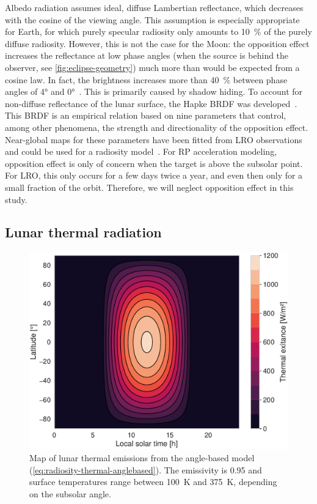 Albedo radiation assumes ideal, diffuse Lambertian reflectance, which decreases with the cosine of the viewing angle. This assumption is especially appropriate for Earth, for which purely specular radiosity only amounts to \qty{10}{\percent} of the purely diffuse radiosity. However, this is not the case for the Moon: the opposition effect increases the reflectance at low phase angles (when the source is behind the observer, see \cref{fig:eclipse-geometry}) much more than would be expected from a cosine law. In fact, the brightness increases more than \qty{40}{\percent} between phase angles of \ang{4} and \ang{0}~\cite{Buratti1996}. This is primarily caused by shadow hiding. To account for non-diffuse reflectance of the lunar surface, the Hapke \gls{BRDF} was developed~\cite{Hapke2012}. This \gls{BRDF} is an empirical relation based on nine parameters that control, among other phenomena, the strength and directionality of the opposition effect. Near-global maps for these parameters have been fitted from \gls{LRO} observations and could be used for a radiosity model~\cite{Sato2014}. For \gls{RP} acceleration modeling, opposition effect is only of concern when the target is above the subsolar point. For \gls{LRO}, this only occurs for a few days twice a year, and even then only for a small fraction of the orbit. Therefore, we will neglect opposition effect in this study.



\subsection{Lunar thermal radiation}

\begin{figure}[t]
    \centering
    \includegraphics[width=\linewidth]{figures/plots/thermal_map.pdf}
    \caption{Map of lunar thermal emissions from the angle-based model (\cref{eq:radiosity-thermal-anglebased}). The emissivity is 0.95 and surface temperatures range between \qty{100}{K} and \qty{375}{K}, depending on the subsolar angle.}
    \label{fig:thermal-map}
\end{figure}

